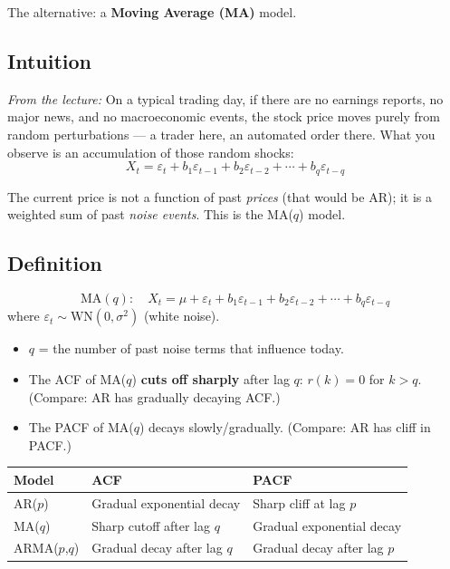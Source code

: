 \documentclass[11pt]{article}
\begin{document}
The alternative: a \textbf{Moving Average (MA)} model.

\subsection{Intuition}
\textit{From the lecture:} On a typical trading day, if there are no earnings
reports, no major news, and no macroeconomic events, the stock price moves
purely from random perturbations --- a trader here, an automated order there.
What you observe is an accumulation of those random shocks:
\[
X_t = \varepsilon_t + b_1 \varepsilon_{t-1} + b_2 \varepsilon_{t-2}
    + \cdots + b_q \varepsilon_{t-q}
\]

The current price is not a function of past \emph{prices} (that would be AR);
it is a weighted sum of past \emph{noise events}. This is the MA($q$) model.

\subsection{Definition}
\[
\text{MA}(q):\quad X_t = \mu + \varepsilon_t + b_1 \varepsilon_{t-1}
    + b_2 \varepsilon_{t-2} + \cdots + b_q \varepsilon_{t-q}
\]
where $\varepsilon_t \sim \text{WN}(0, \sigma^2)$ (white noise).

\begin{itemize}
    \item $q$ = the number of past noise terms that influence today.
    \item The ACF of MA($q$) \textbf{cuts off sharply} after lag $q$:
      $r(k) = 0$ for $k > q$. (Compare: AR has gradually decaying ACF.)
    \item The PACF of MA($q$) decays slowly/gradually. (Compare: AR has
      cliff in PACF.)
\end{itemize}

\begin{center}
\begin{tabular}{@{}lll@{}}
\toprule
\textbf{Model} & \textbf{ACF} & \textbf{PACF} \\
\midrule
AR($p$) & Gradual exponential decay & Sharp cliff at lag $p$ \\
MA($q$) & Sharp cutoff after lag $q$ & Gradual exponential decay \\
ARMA($p$,$q$) & Gradual decay after lag $q$ & Gradual decay after lag $p$ \\
\bottomrule
\end{tabular}
\end{center}
\end{document}
